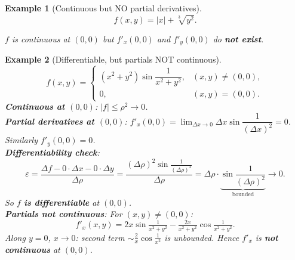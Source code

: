 \documentclass[12pt,a4paper]{article}
\newtheorem{example}{Example}
\begin{document}
\begin{example}[Continuous but NO partial derivatives]
\[
  f(x,y)=|x|+\sqrt[3]{y^2}.
\]

\begin{center}
\end{center}
$f$ is continuous at $(0,0)$ but $f'_x(0,0)$ and $f'_y(0,0)$ do \textbf{not exist}.
\end{example}

\begin{example}[Differentiable, but partials NOT continuous]
\[
  f(x,y)=\begin{cases}
    (x^2+y^2)\sin\dfrac{1}{x^2+y^2},&(x,y)\ne(0,0),\\0,&(x,y)=(0,0).
  \end{cases}
\]
\textbf{Continuous at $(0,0)$}: $|f|\le\rho^2\to 0$.\\[4pt]
\textbf{Partial derivatives at $(0,0)$}: $f'_x(0,0)=\lim_{\Delta x\to 0}\Delta x\sin\dfrac{1}{(\Delta x)^2}=0$.
Similarly $f'_y(0,0)=0$.\\[4pt]
\textbf{Differentiability check}:
\[
  \varepsilon = \frac{\Delta f - 0\cdot\Delta x - 0\cdot\Delta y}{\Delta\rho}
  = \frac{(\Delta\rho)^2\sin\frac{1}{(\Delta\rho)^2}}{\Delta\rho}
  = \Delta\rho\cdot\underbrace{\sin\frac{1}{(\Delta\rho)^2}}_{\text{bounded}} \to 0.
\]
So $f$ \textbf{is differentiable} at $(0,0)$.\\[4pt]
\textbf{Partials not continuous}: For $(x,y)\ne(0,0)$:
\[
  f'_x(x,y) = 2x\sin\tfrac{1}{x^2+y^2} - \tfrac{2x}{x^2+y^2}\cos\tfrac{1}{x^2+y^2}.
\]
Along $y=0$, $x\to 0$: second term $\sim \frac{2}{x}\cos\frac{1}{x^2}$ is unbounded.
Hence $f'_x$ is \textbf{not continuous} at $(0,0)$.
\end{example}
\end{document}
